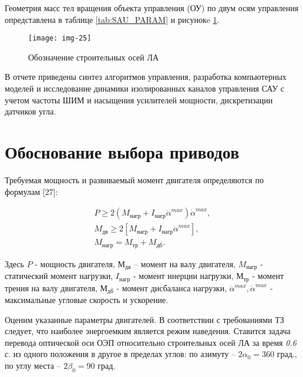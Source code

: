 
Геометрия масс тел вращения объекта управления (ОУ) по двум осям управления опредставлена в таблице \ref{tab:SAU_PARAM} и рисунокe \ref{fig:41}.


\begin{figure}[!ht]
	\centering
	\texttt{[image: img-25]} 
	\caption{Обозначение строительных осей ЛА}
	\label{fig:41}
\end{figure}


В отчете приведены синтез алгоритмов управления, разработка компьютерных моделей и исследование динамики изолированных каналов управления САУ с учетом частоты ШИМ и насыщения усилителей мощности, дискретизации датчиков угла.


\section{Обоснование выбора приводов} \label{ch:ch4/sect2}

Требуемая мощность и развиваемый момент двигателя определяются по формулам [27]:\par


\begin{equation}
	\label{eq:p4:1}
	\begin{multlined}
P \geq 2 \left( M_{\textit{нагр}}+I_{\textit{нагр}} \ddot \alpha^{max}   \right) \dot \alpha^{max},\\
M_{\textit{дв}} \geq 2 \left[ M_{\textit{нагр}}+I_{\textit{нагр}} \ddot \alpha^{max}  \right], \\
M_{\textit{нагр}}=M_{\textit{тр}}+M_{\textit{дб}}.
\end{multlined}
\end{equation}

Здесь 
$P$ - мощность двигателя, 
$М_{\textit{дв}}$ – момент на валу двигателя, 
$M_{\textit{нагр}}$ - статический момент нагрузки, 
$I_{\textit{нагр}}$ - момент  инерции нагрузки, 
$М_{\textit{тр}}$ - момент трения на валу двигателя,
$М_{\textit{дб}}$ - момент дисбаланса нагрузки,  
$\ddot \alpha^{max}, \dot \alpha^{max}$ - максимальные угловые скорость и ускорение.\par

Оценим указанные параметры двигателей. 
В соответствии с требованиями ТЗ следует, что наиболее энергоемким является режим наведения. Ставится задача перевода оптической оси ОЭП относительно строительных осей ЛА за время \textit{0.6 с}. из одного положения в другое в пределах углов: по азимуту – $2 \alpha_0 = 360$ град., по углу места – $2 \beta_0 = 90$ град.  \par

